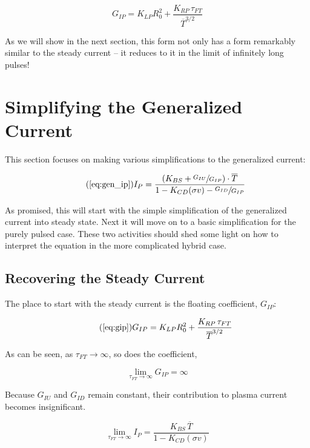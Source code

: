 \begin{equation}
	\label{eq:gip}
	G_{IP} = K_{LP} R_0^2 + \frac{ K_{RP} \, \tau_{FT} }{ \overline T ^ {3/2} }
\end{equation}

As we will show in the next section, this form not only has a form remarkably similar to the steady current -- it reduces to it in the limit of infinitely long pulses!

\section{Simplifying the Generalized Current}

This section focuses on making various simplifications to the generalized current:

\begin{equation}
	\tag{\ref{eq:gen_ip}}
	I_P = \frac{ \left( K_{BS} + \sfrac{ G_{IU} }{ G_{IP} } \right) \cdot \overline T }{ 1 - K_{CD} ( \sigma v ) - \sfrac{ G_{ID} }{ G_{IP} } }
\end{equation}

As promised, this will start with the simple simplification of the generalized current into steady state. Next it will move on to a basic simplification for the purely pulsed case. These two activities should shed some light on how to interpret the equation in the more complicated hybrid case.

\subsection{Recovering the Steady Current}

The place to start with the steady current is the floating coefficient, $G_{IP}$:

\begin{equation}
	\tag{\ref{eq:gip}}
	G_{IP} = K_{LP} R_0^2 + \frac{ K_{RP} \, \tau_{FT} }{ \overline T ^ {3/2} }
\end{equation}

As can be seen, as $\tau_{FT} \to \infty$, so does the coefficient,

\begin{equation}
	\lim_{\tau_{FT} \to \infty} G_{IP} = \infty
\end{equation}

Because $G_{IU}$ and $G_{ID}$ remain constant, their contribution to plasma current becomes insignificant.

\begin{equation}
	\label{eq:tau_inf}
	\lim_{\tau_{FT} \to \infty} I_P = \frac{ K_{BS} \, \overline T }{ 1 - K_{CD} ( \sigma v ) }
\end{equation}


